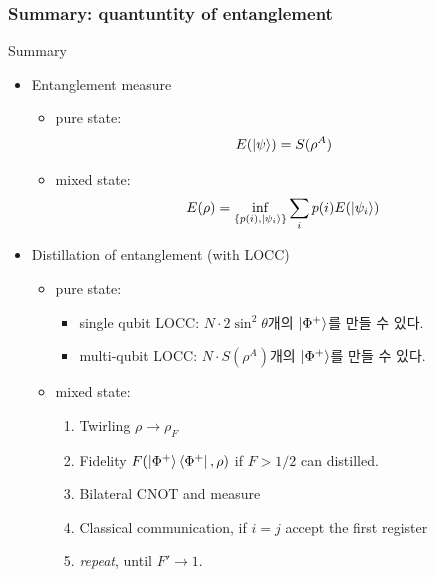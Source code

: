 \documentclass[9pt]{beamer}
\begin{document}
    \begin{frame}
        \frametitle{Summary: quantuntity of entanglement}
        \begin{block}{Summary}
            \begin{itemize}
                \item Entanglement measure
                \begin{itemize}
                    \item pure state:
                    \begin{equation*}
                        E(\ket{\psi}) = S(\rho^A)
                    \end{equation*}
                    \item mixed state:
                    \begin{equation*}
                        E(\rho) = \inf_{\{p(i), \ket{\psi_i}\}} \sum_i p(i) E(\ket{\psi_i})
                    \end{equation*}
                \end{itemize}
                \item Distillation of entanglement (with LOCC)
                \begin{itemize}
                    \item pure state:
                    \begin{itemize}
                        \item single qubit LOCC: $N \cdot 2\sin^2 \theta$개의 $\ket{\Phi^+}$를 만들 수 있다.
                        \item multi-qubit LOCC: $N \cdot S(\rho^A)$개의 $\ket{\Phi^+}$를 만들 수 있다.
                    \end{itemize}
                    \item mixed state:
                    \begin{enumerate}
                        \item Twirling $\rho \rightarrow \rho_F$ 
                        \item Fidelity $F(\ket{\Phi^+}\bra{\Phi^+}, \rho)$ if $F>1/2$ can distilled.
                        \item Bilateral CNOT and measure
                        \item Classical communication, if $i=j$ accept the first register
                        \item \textit{repeat}, until $F' \rightarrow 1$. 
                    \end{enumerate}
                \end{itemize}
            \end{itemize}
        \end{block}
    \end{frame}
\end{document}
